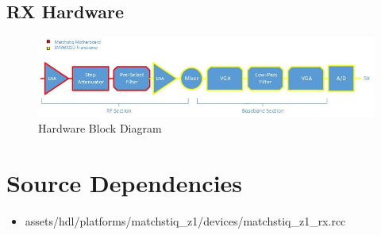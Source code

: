 \documentclass{article}
\begin{document}
\subsection*{RX Hardware}
\begin{figure}[ht]
	\centerline{\includegraphics[scale=0.7]{matchstiq_FE_RX_HW}}
	\caption{Hardware Block Diagram}
	\label{fig:hw}
\end{figure}
\vspace{25 mm}
\newpage

\section*{Source Dependencies}
\begin{itemize}
	\item assets/hdl/platforms/matchstiq\_z1/devices/matchstiq\_z1\_rx.rcc
\end{itemize}
\end{document}
